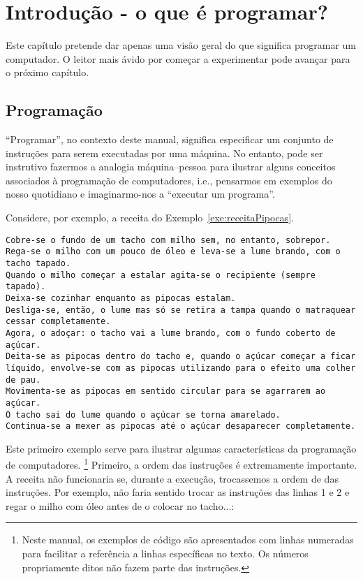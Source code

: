 \chapter{Introdução - o que é programar?}

Este capítulo pretende dar apenas uma visão geral do que significa programar um computador. O leitor mais ávido por começar a experimentar pode avançar para o próximo capítulo.

\section{Programação}
``Programar'', no contexto deste manual, significa especificar um conjunto de instruções para serem executadas por uma máquina. No entanto, pode ser instrutivo fazermos a analogia máquina--pessoa para ilustrar alguns conceitos associados à programação de computadores, i.e., pensarmos em exemplos do nosso quotidiano e imaginarmo-nos a ``executar um programa''.


Considere, por exemplo, a receita do Exemplo~\ref{exe:receitaPipocas}.

\begin{lstlisting}[caption={Receita de pipocas. Adaptado de \url{http://lifestyle.sapo.pt/sabores/receitas/pipocas-doces-caseiras}.}, label=exe:receitaPipocas]
Cobre-se o fundo de um tacho com milho sem, no entanto, sobrepor. 
Rega-se o milho com um pouco de óleo e leva-se a lume brando, com o tacho tapado. 
Quando o milho começar a estalar agita-se o recipiente (sempre tapado).
Deixa-se cozinhar enquanto as pipocas estalam. 
Desliga-se, então, o lume mas só se retira a tampa quando o matraquear cessar completamente.
Agora, o adoçar: o tacho vai a lume brando, com o fundo coberto de açúcar. 
Deita-se as pipocas dentro do tacho e, quando o açúcar começar a ficar líquido, envolve-se com as pipocas utilizando para o efeito uma colher de pau. 
Movimenta-se as pipocas em sentido circular para se agarrarem ao açúcar. 
O tacho sai do lume quando o açúcar se torna amarelado.
Continua-se a mexer as pipocas até o açúcar desaparecer completamente.
\end{lstlisting}

Este primeiro exemplo serve para ilustrar algumas características da programação de computadores.%
\footnote{
Neste manual, os exemplos de código são apresentados com linhas numeradas para facilitar a referência a linhas específicas no texto. Os números propriamente ditos não fazem parte das instruções.
}%
Primeiro, a ordem das instruções é extremamente importante. A receita não funcionaria se, durante a execução, trocassemos a ordem de das instruções. Por exemplo, não faria sentido trocar as instruções das linhas 1 e 2 e regar o milho com  óleo antes de o colocar no tacho...:

